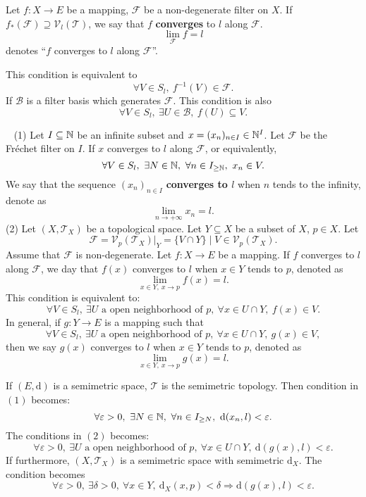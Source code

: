 \begin{definitionenv}
    Let $f:X\longrightarrow E$ be a mapping, $\mathcal{F}$ be a non-degenerate filter on $X$. If $f_*(\mathcal{F})\supseteq \mathcal{V}_l(\mathscr{T})$, we say that $f$ \textbf{converges} to $l$ along $\mathcal{F}$.
    $$\lim_{\mathcal{F}}f=l $$
    denotes ``$f$ converges to $l$ along $\mathcal{F}$''.

    This condition is equivalent to 
    $$\forall V\in S_l,\ f^{-1}(V)\in \mathcal{F}.$$
    If $\mathcal{B}$ is a filter basis which generates $\mathcal{F}$. This condition is also 
    $$\forall V\in S_l,\ \exists U\in \mathcal{B},\ f(U)\subseteq V.$$
    
\end{definitionenv}
\begin{exampleenv}
    \ \newline
    (1) Let $I\subseteq \mathbb{N}$ be an infinite subset and $x=(x_n)_{n\in I}\in \mathbb{N}^I$. Let $\mathcal{F}$ be the Fréchet filter on $I$. If $x$ converges to $l$ along $\mathcal{F}$, or equivalently,
    $$\forall V\in S_l,\ \exists N\in \mathbb{N},\ \forall n\in I_{\ge \mathbb{N}},\ x_n\in V.$$
    We say that the sequence $(x_n)_{n\in I}$ \textbf{converges to $l$} when $n$ tends to the infinity, denote as 
    $$\lim_{n\rightarrow+\infty}x_n=l.$$
    \newline
    (2) Let $(X,\mathscr{T}_X)$ be a topological space. Let $Y\subseteq X$ be a subset of $X$, $p\in X$. Let 
    $$\mathcal{F}=\mathcal{V}_p(\mathscr{T}_X)|_Y=\{V\cap Y\}\mid V\in \mathcal{V}_p(\mathscr{T}_X).$$
    Assume that $\mathcal{F}$ is non-degenerate. Let $f:X\longrightarrow E$ be a mapping. If $f$ converges to $l$ along $\mathcal{F}$, we day that $f(x)$ converges to $l$ when $x\in Y$ tends to $p$, denoted as 
    $$\lim_{x\in Y,\ x\rightarrow p}f(x)=l.$$
    This condition is equivalent to:
    $$\forall V\in S_l,\ \exists U \text{ a open neighborhood of }p, \ \forall x\in U\cap Y, \ f(x)\in V.$$
    In general, if $g:Y\longrightarrow E$ is a mapping such that
    $$\forall V\in S_l,\ \exists U \text{ a open neighborhood of }p, \ \forall x\in U\cap Y, \ g(x)\in V,$$
    then we say $g(x)$ converges to $l$ when $x\in Y$ tends to $p$, denoted as 
    $$\lim_{x\in Y,\ x\rightarrow p}g(x)=l.$$
\end{exampleenv}
\begin{remark}
    If $(E,\mathrm{d})$ is a semimetric space, $\mathscr{T}$ is the semimetric topology. Then condition in $(1)$ becomes:
    $$\forall \varepsilon >0,\ \exists N\in \NN,\ \forall n\in I_{\ge N},\ \mathrm{d}(x_n,l)<\varepsilon.$$
    The conditions in $(2)$ becomes:
    $$\forall \varepsilon >0,\ \exists U \text{ a open neighborhood of }p, \ \forall x\in U\cap Y, \ \mathrm{d}(g(x),l)<\varepsilon.$$
    If furthermore, $(X,\mathscr{T}_X)$ is a semimetric space with semimetric $\mathrm{d}_X$. The condition becomes 
    $$\forall \varepsilon>0,\ \exists \delta>0,\ \forall x\in Y,\ \mathrm{d}_X(x,p)<\delta\Rightarrow \mathrm{d}(g(x),l)<\varepsilon.$$
\end{remark}
